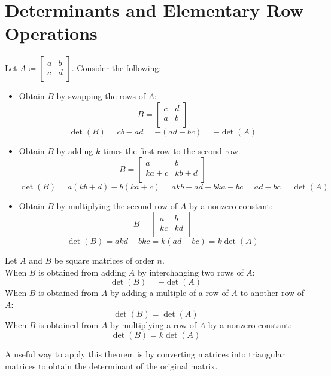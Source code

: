 \section{Determinants and Elementary Row Operations}
Let \(A\coloneqq \begin{bmatrix}
    a &b   \\
     c&   d\\
\end{bmatrix}\). Consider the following:
\begin{itemize}
    \item Obtain \(B\) by swapping the rows of \(A\):
\[
    B=\begin{bmatrix}
        c &d   \\
         a&b   \\
    \end{bmatrix}
\]
\[
    \det(B)=cb-ad=-(ad-bc)=-\det(A)
\]
\item Obtain \(B\) by adding \(k\) times the first row to the second row.
    \[
        B=\begin{bmatrix}
            a &b   \\
             ka+c&kb+d   \\
        \end{bmatrix}
    \]
    \[
        \det(B)=a(kb+d)-b(ka+c)=akb+ad-bka-bc=ad-bc=\det(A)
    \]
\item Obtain \(B\) by multiplying the second row of \(A\) by a nonzero constant:
\[
    B=\begin{bmatrix}
        a &b   \\
         kc&kd   \\
    \end{bmatrix}
\]
\[
    \det(B)=akd-bkc=k(ad-bc)=k\det(A)
\]
\end{itemize}
\begin{theorem}\label{thm:erod}
    Let \(A\) and \(B\) be square matrices of order \(n\).\\
    When \(B\) is obtained from adding \(A\) by interchanging two rows of \(A\):
    \[
        \det(B)=-\det(A)
    \]
    When \(B\) is obtained from \(A\) by adding a multiple of a row of \(A\) to another row of \(A\):
    \[
        \det(B)=\det(A)
    \]
    When \(B\) is obtained from \(A\) by multiplying a row of \(A\) by a nonzero constant:
    \[
        \det(B)=k\det(A)
    \]
\end{theorem}
A useful way to apply this theorem is by converting matrices into triangular matrices to obtain the determinant of the original matrix.
